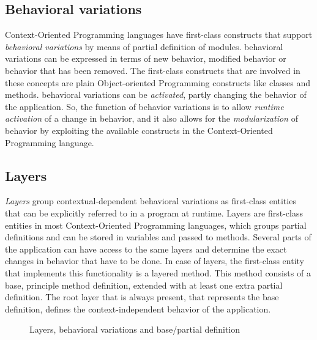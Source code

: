 \documentclass{acm_proc_article-sp}
\begin{document}
\subsection{Behavioral variations}
\label{sec:behavioral_variations}
Context-Oriented Programming languages have first-class constructs that support \textit{behavioral variations} by means of partial definition of modules. behavioral variations can be expressed in terms of new behavior, modified behavior or behavior that has been removed. The first-class constructs that are involved in these concepts are plain Object-oriented Programming constructs like classes and methods. behavioral variations can be \textit{activated}, partly changing the behavior of the application. So, the function of behavior variations is to allow \textit{runtime activation} of a change in behavior, and it also allows for the \textit{modularization} of behavior by exploiting the available constructs in the Context-Oriented Programming language.    

\subsection{Layers}
\label{sec:layers}
\textit{Layers} group contextual-dependent behavioral variations as first-class entities that can be explicitly referred to in a program at runtime. Layers are first-class entities in most Context-Oriented Programming languages, which groups partial definitions and can be stored in variables and passed to methods. Several parts of the application can have access to the same layers and determine the exact changes in behavior that have to be done. In case of layers, the first-class entity that implements this functionality is a layered method. This method consists of a base, principle method definition, extended with at least one extra partial definition. The root layer that is always present, that represents the base definition, defines the context-independent behavior of the application.

\begin{figure}[H]
\centering
{}
\caption{Layers, behavioral variations and base/partial definition}
\label{fig:layers}
\end{figure}
\end{document}

